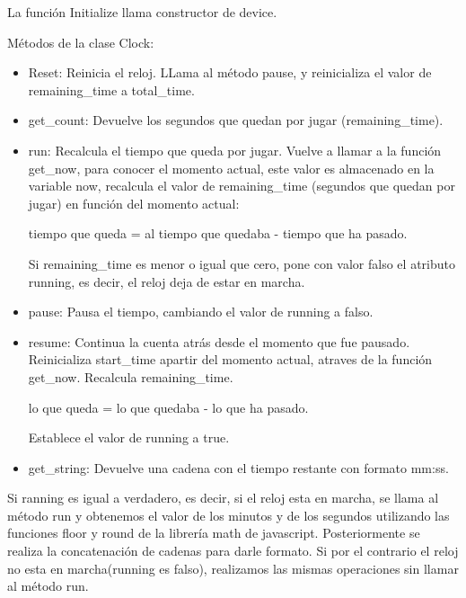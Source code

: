 La función Initialize llama constructor de device.

Métodos de la clase Clock:

\begin{itemize}
 \item Reset: Reinicia el reloj. LLama al método pause, y reinicializa el valor de remaining\_time a total\_time.

 \item get\_count: Devuelve los segundos que quedan por jugar (remaining\_time).

 \item run: Recalcula el tiempo que queda por jugar. Vuelve a llamar a la función get\_now, para conocer el momento actual, este valor es almacenado 
en la variable now, recalcula el valor de remaining\_time (segundos que quedan por jugar) en función del momento actual:

        tiempo que queda = al tiempo que quedaba - tiempo que ha pasado.
        
Si remaining\_time es menor o igual que cero, pone con valor falso el atributo running, es decir, el reloj deja de estar en marcha.

 \item pause: Pausa el tiempo, cambiando el valor de running a falso.

 \item resume: Continua la cuenta atrás desde el momento que fue pausado. Reinicializa start\_time apartir del momento actual, atraves de la 
 función get\_now. Recalcula remaining\_time.

        lo que queda = lo que quedaba - lo que ha pasado.

Establece el valor de running a true.

 \item get\_string: Devuelve una cadena con el tiempo restante con formato mm:ss.
\end{itemize}

Si ranning es igual a verdadero, es decir, si el reloj esta en marcha, se llama al método run y obtenemos el valor de los minutos y de los 
segundos utilizando las funciones floor y round de la librería math de javascript. Posteriormente se realiza la concatenación de cadenas para 
darle formato. Si por el contrario el reloj no esta en marcha(running es falso), realizamos las mismas operaciones sin llamar al método run.


